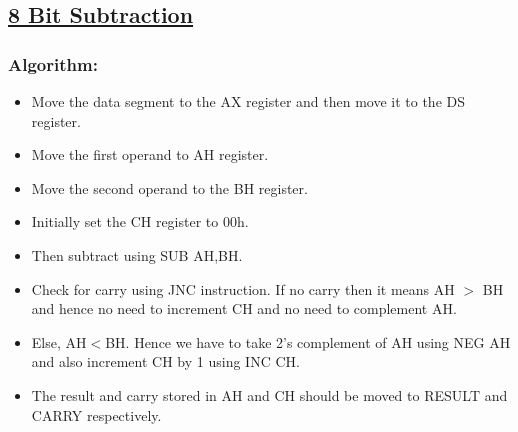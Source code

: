 \documentclass[12pt,a4paper]{article}
\begin{document}
\begin{flushleft}
\subsection*{\textbf{\underline{8 Bit Subtraction}}}

\subsubsection*{\textbf{Algorithm:}}
\begin{itemize}
    \item Move the data segment to the AX register and then move it to the DS register.
    \item Move the first operand to AH register.
    \item Move the second operand to the BH register.
    \item Initially set the CH register to 00h.
\item Then subtract using SUB AH,BH.
\item Check for carry using JNC instruction. If no carry then it means AH $>$ BH and hence no need to increment CH and no need to complement AH.
\item Else, AH$<$BH. Hence we have to take 2’s complement of AH using NEG AH and also increment CH by 1 using INC CH.
\item The result and carry stored in AH and CH should be moved to RESULT and CARRY respectively.
\end{itemize}

\newpage

\end{flushleft}
\end{document}
